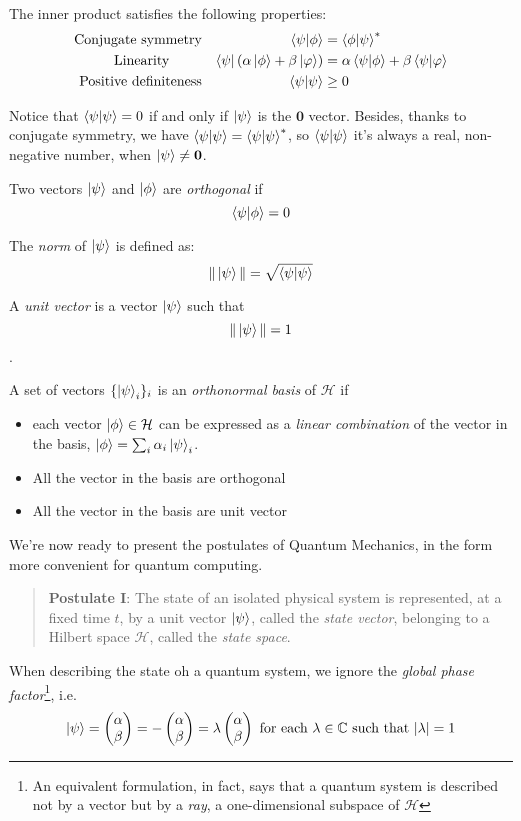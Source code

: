 \documentclass[10pt,a4paper, titlepage]{report}
\theoremstyle{definition}
\newcommand{\kp}{\ket{\psi}}
\newcommand{\kf}{\ket{\phi}}
\newcommand{\calH}{\mathcal{H}}
\begin{document}
The inner product satisfies the following properties:
\begin{align*}
\text{Conjugate symmetry} & &  \braket{\psi | \phi} &= \braket{\phi | \psi}^* \\
\text{Linearity \quad\quad} & & \bra{\psi} (\alpha\ket{\phi} + \beta\ket{\varphi}) &= \alpha\braket{\psi | \phi} + \beta\braket{\psi | \varphi}\\
\text{Positive definiteness} & & \braket{\psi | \psi} &\geq 0
\end{align*}

Notice that $\braket{\psi|\psi} = 0$ if and only if $\kp$ is the $\mathbf{0}$ vector. Besides, thanks to conjugate symmetry, we have $\braket{\psi | \psi} = \braket{\psi | \psi} ^ *$, so $\braket{\psi | \psi}$ it's always a real, non-negative number, when $\kp \neq \mathbf{0}$.

Two vectors $\kp$ and $\kf$ are \textit{orthogonal} if
 \[\braket{\psi | \phi} = 0\]


The \textit{norm} of $\kp$ is defined as: 
\[ \|\kp\| = \sqrt{\braket{\psi|\psi}}\]


A \textit{unit vector} is a vector $\kp$ such that \[\|\kp\| = 1\].

A set of vectors $\{\kp_i\}_i$ is an \textit{orthonormal basis} of $\calH$ if \begin{itemize}
	\item each vector $\kf \in \calH$ can be expressed as a \textit{linear combination} of the vector in the basis, $\kf = \sum_i \alpha_i\kp_i$.
	\item All the vector in the basis are orthogonal
	\item All the vector in the basis are unit vector 
\end{itemize}

We're now ready to present the postulates of Quantum Mechanics, in the form more convenient for quantum computing.

\begin{quote} 
\textbf{Postulate I}: The state of an isolated physical system is represented, at a fixed time $t$, by a unit vector $\kp$, called the \textit{state vector}, belonging to a Hilbert space $\calH$, called the \textit{state space}. 
\end{quote}

 When describing the state oh a quantum system, we ignore the \textit{global phase factor}\footnote{An equivalent formulation, in fact, says that a quantum system is described not by a vector but by a \textit{ray}, a one-dimensional subspace of $\calH$}, i.e. 
 \[
 	\kp = \begin{pmatrix}
	\alpha \\
	\beta
	\end{pmatrix} = - \begin{pmatrix}
	\alpha \\
	\beta
	\end{pmatrix} = \lambda \begin{pmatrix}
	\alpha \\
	\beta
	\end{pmatrix} 
	\text{ for each $\lambda \in \mathbb{C}$  such that $|\lambda| = 1$}
 \]
\end{document}
